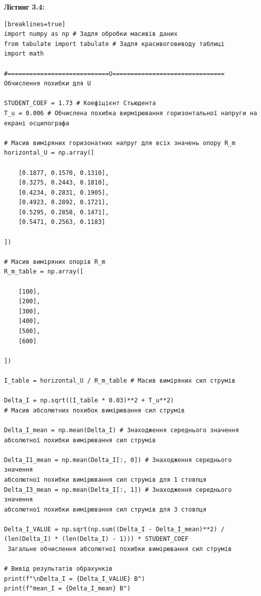 \documentclass[12pt,a4paper]{article}
\begin{document}
    \vspace{3em}

    \hypertarget{listing4}{}

    \textbf{\large Лістинг 3.4:}

    \vspace{1em}

    \small{

    \begin{verbatim}[breaklines=true]
import numpy as np # Задля обробки масивів даних
from tabulate import tabulate # Задля красивоговиводу таблиці
import math

#============================U=============================== Обчислення похибки для U

STUDENT_COEF = 1.73 # Коефіцієнт Стьюдента
T_u = 0.006 # Обчислена похибка вирмірювання горизонтальної напруги на екрані осцилографа

# Масив виміряних горизонатних напруг для всіх значень опору R_m
horizontal_U = np.array([

    [0.1877, 0.1570, 0.1310],
    [0.3275, 0.2443, 0.1810],
    [0.4234, 0.2831, 0.1905],
    [0.4923, 0.2892, 0.1721],
    [0.5295, 0.2858, 0.1471],
    [0.5471, 0.2563, 0.1183]

])

# Масив виміряних опорів R_m
R_m_table = np.array([

    [100],
    [200],
    [300],
    [400],
    [500],
    [600]

])

I_table = horizontal_U / R_m_table # Масив виміряних сил струмів

Delta_I = np.sqrt((I_table * 0.03)**2 + T_u**2)
# Масив абсолютних похибок вимірювання сил струмів

Delta_I_mean = np.mean(Delta_I) # Знаходження середнього значення
абсолютної похибки вимірювання сил струмів

Delta_I1_mean = np.mean(Delta_I[:, 0]) # Знаходження середнього значення
абсолютної похибки вимірювання сил струмів для 1 стовпця
Delta_I3_mean = np.mean(Delta_I[:, 1]) # Знаходження середнього значення
абсолютної похибки вимірювання сил струмів для 3 стовпця

Delta_I_VALUE = np.sqrt(np.sum((Delta_I - Delta_I_mean)**2) /
(len(Delta_I) * (len(Delta_I) - 1))) * STUDENT_COEF 
 Загальне обчислення абсолютної похибки вимірювання сил струмів

# Вивід результатів обрахунків
print(f"\nDelta_I = {Delta_I_VALUE} В")
print(f"mean_I = {Delta_I_mean} В")


\end{verbatim}}
\end{document}

